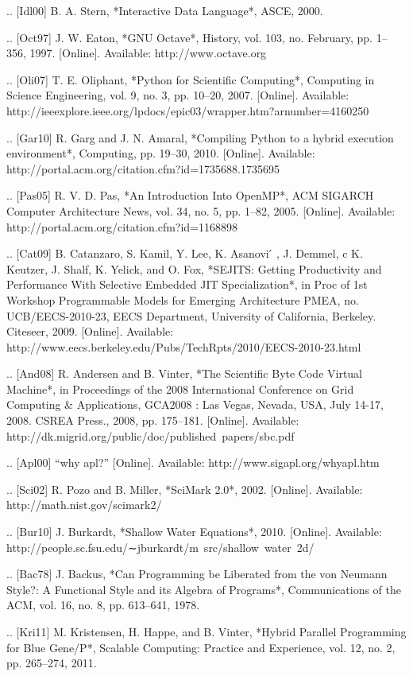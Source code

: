 .. [Idl00] B. A. Stern, *Interactive Data Language*,
            ASCE, 2000.

.. [Oct97] J. W. Eaton, *GNU Octave*,
            History, vol. 103, no. February, pp. 1–356, 1997. [Online]. Available: http://www.octave.org

.. [Oli07] T. E. Oliphant, *Python for Scientific Computing*,
            Computing in Science Engineering, vol. 9, no. 3, pp. 10–20, 2007. [Online]. Available: http://ieeexplore.ieee.org/lpdocs/epic03/wrapper.htm?arnumber=4160250

.. [Gar10] R. Garg and J. N. Amaral, *Compiling Python to a hybrid execution environment*,
            Computing, pp. 19–30, 2010. [Online]. Available: http://portal.acm.org/citation.cfm?id=1735688.1735695

.. [Pas05] R. V. D. Pas, *An Introduction Into OpenMP*,
            ACM SIGARCH Computer Architecture News, vol. 34, no. 5, pp. 1–82, 2005. [Online]. Available: http://portal.acm.org/citation.cfm?id=1168898

.. [Cat09] B. Catanzaro, S. Kamil, Y. Lee, K. Asanovi ́ , J. Demmel, c K. Keutzer, J. Shalf, K. Yelick, and O. Fox, *SEJITS: Getting Productivity and Performance With Selective Embedded JIT Specialization*,
            in Proc of 1st Workshop Programmable Models for Emerging Architecture PMEA, no. UCB/EECS-2010-23, EECS Department, University of California, Berkeley. Citeseer, 2009. [Online]. Available: http://www.eecs.berkeley.edu/Pubs/TechRpts/2010/EECS-2010-23.html

.. [And08] R. Andersen and B. Vinter, *The Scientific Byte Code Virtual Machine*,
            in Proceedings of the 2008 International Conference on Grid Computing & Applications, GCA2008 : Las Vegas, Nevada, USA, July 14-17, 2008. CSREA Press., 2008, pp. 175–181. [Online]. Available: http://dk.migrid.org/public/doc/published\ papers/sbc.pdf

.. [Apl00] “why apl?”
            [Online]. Available: http://www.sigapl.org/whyapl.htm

.. [Sci02] R. Pozo and B. Miller, *SciMark 2.0*,
            2002. [Online]. Available: http://math.nist.gov/scimark2/

.. [Bur10] J. Burkardt, *Shallow Water Equations*,
            2010. [Online]. Available: http://people.sc.fsu.edu/∼jburkardt/m\ src/shallow\ water\ 2d/

.. [Bac78] J. Backus, *Can Programming be Liberated from the von Neumann Style?: A Functional Style and its Algebra of Programs*,
            Communications of the ACM, vol. 16, no. 8, pp. 613–641, 1978.

.. [Kri11] M. Kristensen, H. Happe, and B. Vinter, *Hybrid Parallel Programming for Blue Gene/P*,
            Scalable Computing: Practice and Experience, vol. 12, no. 2, pp. 265–274, 2011.

